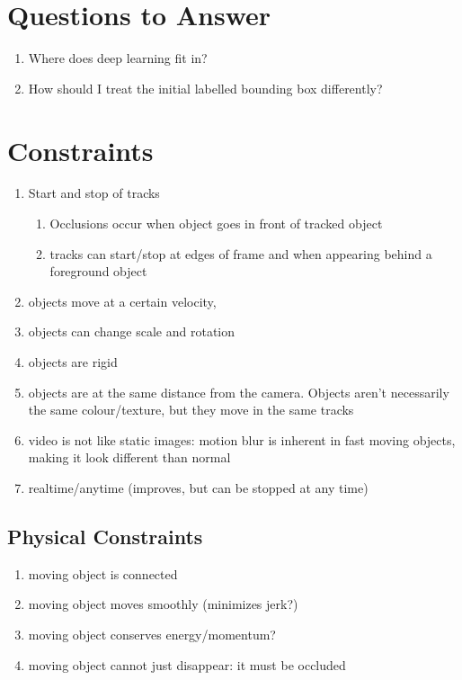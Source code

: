 \section{Questions to Answer}
\begin{enumerate}
\item Where does deep learning fit in?
\item How should I treat the initial labelled bounding box differently?
\end{enumerate}

\section{Constraints}
\begin{enumerate}
	\item Start and stop of tracks
	\begin{enumerate}
		\item Occlusions occur when object goes in front of tracked object
		\item tracks can start/stop at edges of frame and when appearing behind a foreground object
	\end{enumerate}
	\item objects move at a certain velocity, 
	\item objects can change scale and rotation
	\item objects are rigid
	\item objects are at the same distance from the camera. Objects aren't necessarily the same colour/texture, but they move in the same tracks
	\item video is not like static images: motion blur is inherent in fast moving objects, making it look different than normal
	\item realtime/anytime (improves, but can be stopped at any time)
\end{enumerate}

\subsection{Physical Constraints}
\begin{enumerate}
\item moving object is connected
\item moving object moves smoothly (minimizes jerk?)
\item moving object conserves energy/momentum?
\item moving object cannot just disappear: it must be occluded
\end{enumerate}

